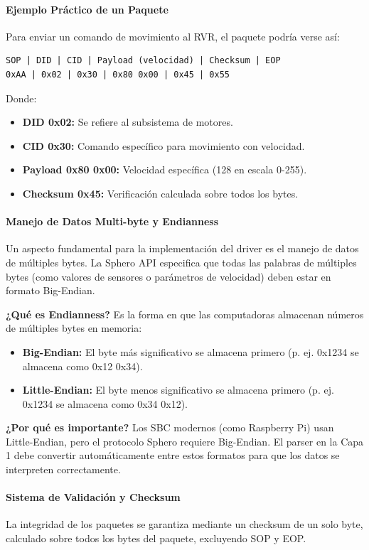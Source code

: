 \documentclass[11pt]{article}
\numberwithin{figure}{section}
\numberwithin{table}{section}
\begin{document}
\paragraph{Ejemplo Práctico de un Paquete}
Para enviar un comando de movimiento al RVR, el paquete podría verse así:
\begin{verbatim}
SOP | DID | CID | Payload (velocidad) | Checksum | EOP
0xAA | 0x02 | 0x30 | 0x80 0x00 | 0x45 | 0x55
\end{verbatim}

Donde:
\begin{itemize}
    \item \textbf{DID 0x02:} Se refiere al subsistema de motores.
    \item \textbf{CID 0x30:} Comando específico para movimiento con velocidad.
    \item \textbf{Payload 0x80 0x00:} Velocidad específica (128 en escala 0-255).
    \item \textbf{Checksum 0x45:} Verificación calculada sobre todos los bytes.
\end{itemize}

\paragraph{Manejo de Datos Multi-byte y Endianness}
Un aspecto fundamental para la implementación del driver es el manejo de datos de múltiples bytes. La Sphero API especifica que todas las palabras de múltiples bytes (como valores de sensores o parámetros de velocidad) deben estar en formato Big-Endian.

\textbf{¿Qué es Endianness?} Es la forma en que las computadoras almacenan números de múltiples bytes en memoria:
\begin{itemize}
    \item \textbf{Big-Endian:} El byte más significativo se almacena primero (p. ej. 0x1234 se almacena como 0x12 0x34).
    \item \textbf{Little-Endian:} El byte menos significativo se almacena primero (p. ej. 0x1234 se almacena como 0x34 0x12).
\end{itemize}

\textbf{¿Por qué es importante?} Los SBC modernos (como Raspberry Pi) usan Little-Endian, pero el protocolo Sphero requiere Big-Endian. El parser en la Capa 1 debe convertir automáticamente entre estos formatos para que los datos se interpreten correctamente.

\paragraph{Sistema de Validación y Checksum}
La integridad de los paquetes se garantiza mediante un checksum de un solo byte, calculado sobre todos los bytes del paquete, excluyendo SOP y EOP.
\end{document}
